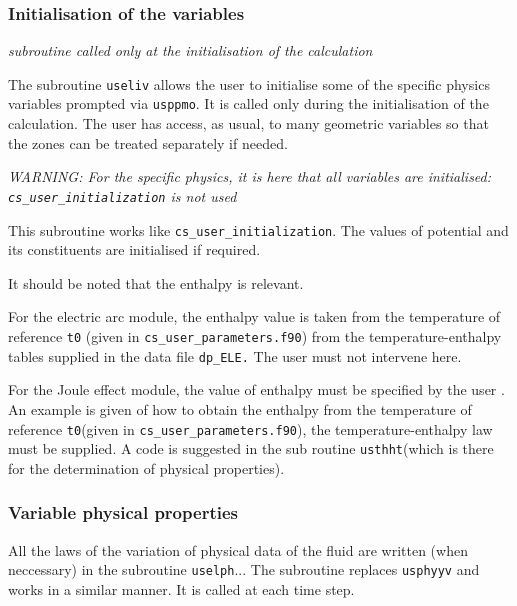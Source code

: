 {{{\subsubsection{Initialisation of the variables}

\noindent
\textit{subroutine called only at the initialisation of the calculation}

The subroutine \texttt{useliv} allows the user to initialise some of the specific
 physics variables
 prompted via \texttt{usppmo}. It is called only during the initialisation of
 the calculation. The user has access, as usual, to many geometric variables so
 that the zones can be treated separately if needed.

{\em WARNING: For the specific physics, it is here that all variables are initialised:
 \texttt{cs\_user\_initialization} is not used}

This subroutine works like \texttt{cs\_user\_initialization}. The values of potential and its
constituents are initialised if required.

It should be noted that the enthalpy is relevant.

\begin{list}{-}{}
\item For the electric arc module, the enthalpy value is taken from the temperature
 of reference \texttt{t0} (given in \texttt{cs\_user\_parameters.f90}) from the temperature-enthalpy
 tables
 supplied in the data file \texttt{dp\_ELE.} The user must not intervene here.
\item For the Joule effect module, the value of enthalpy must be specified by the user
. An example is given of how to obtain the enthalpy from the temperature of reference
 \texttt{t0}(given in \texttt{cs\_user\_parameters.f90}), the temperature-enthalpy law must be
supplied. A code is suggested in the sub routine \texttt{usthht}(which is there for
 the determination of physical properties).
\end{list}

\subsubsection{Variable physical properties}

All the laws of the variation of physical data of the fluid are written (when neccessary)
in the subroutine \texttt{uselph}... The subroutine replaces \texttt{usphyyv} and works
 in a similar manner. It is called at each time step.

}}}
